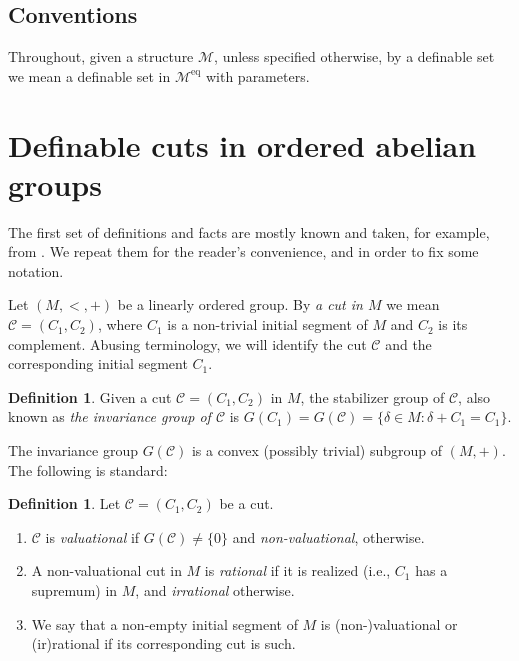\documentclass[11pt]{amsart}
\DeclareMathOperator{\eq}{eq}
\theoremstyle{definition}
\newtheorem{definition}[theorem]{Definition}
\newcommand{\CM}{{\mathcal M}}
\newcommand{\CC}{{\mathcal C}}
\newcommand{\0}{\emptyset}
\begin{document}
\subsection*{Conventions} Throughout, given a structure $\CM$, unless specified otherwise, by a definable set we mean a definable set in $\CM^{\eq}$ with parameters.

\section{Definable cuts in ordered abelian groups}

The first set of definitions and facts are mostly known and taken, for example, from  \cite{FVKNar,Tressl}. We repeat them for the reader's convenience, and in order to fix some notation. 


Let $(M,<,+)$ be a linearly ordered group. By {\em a cut in $M$} we mean $\mathcal C=(C_1,C_2)$, where $C_1$ is a non-trivial initial segment of $M$ and $C_2$ is its complement. 
Abusing terminology, we will identify the cut $\CC$ and the corresponding initial segment $C_1$.

\begin{definition}\label{D: Stab}
Given a cut $\CC=(C_1,C_2)$ in $M$, the stabilizer group of $\CC$, also known as \emph{the invariance group of $\CC$} is  $G(C_1)=G(\CC)=\{\delta\in M: \delta+C_1=C_1\}$. 
\end{definition}

The invariance group $G(\CC)$ is a convex (possibly trivial) subgroup of $(M,+)$. The following is standard:

\begin{definition}\label{D: cuts}
	Let $\CC=(C_1,C_2)$ be a cut. 
	\begin{enumerate}
		\item  $\CC$ is {\em valuational} if $G(\CC)\neq \{0\}$ and {\em non-valuational}, otherwise.
		\item A non-valuational cut in $M$ is \emph{rational} if it is realized (i.e., $C_1$ has a supremum) in $M$, and \emph{irrational} otherwise. %
		\item We say that a non-empty  initial segment  of $M$ is (non-)valuational or (ir)rational if its corresponding cut is such.
	\end{enumerate}	
\end{definition}
\end{document}
